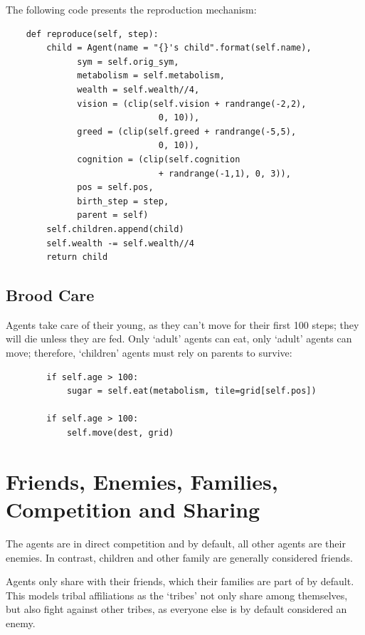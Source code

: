 \noindent
The following code presents the reproduction mechanism:
\begin{verbatim}
    def reproduce(self, step):
        child = Agent(name = "{}'s child".format(self.name),
              sym = self.orig_sym,
              metabolism = self.metabolism,
              wealth = self.wealth//4,
              vision = (clip(self.vision + randrange(-2,2),
                              0, 10)),
              greed = (clip(self.greed + randrange(-5,5),
                              0, 10)),
              cognition = (clip(self.cognition        
                              + randrange(-1,1), 0, 3)),
              pos = self.pos,
              birth_step = step,
              parent = self)            
        self.children.append(child)
        self.wealth -= self.wealth//4
        return child
\end{verbatim}

\subsection{Brood Care}
 Agents take care of their young, as they can't move for their first 100 steps; they will die unless they are fed. Only `adult' agents can eat, only `adult' agents can move; therefore, `children' agents must rely on parents to survive:
 
\begin{verbatim}
        if self.age > 100:
            sugar = self.eat(metabolism, tile=grid[self.pos])

        if self.age > 100:
            self.move(dest, grid)
\end{verbatim}

\section{Friends, Enemies, Families, Competition and Sharing}

The agents are in direct competition and by default, all other agents are their enemies. In contrast, children and other family are generally considered friends.

Agents only share with their friends, which their families are part of by default. This models tribal affiliations as the `tribes' not only share among themselves, but also fight against other tribes, as everyone else is by default considered an enemy.
 
